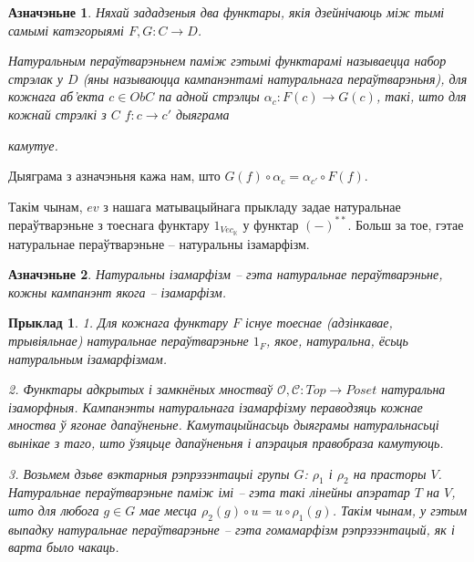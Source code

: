 \documentclass[a4paper,12pt]{book}
\newtheorem{example}{Прыклад}[section]
\newtheorem{definition}{Азначэньне}[section]
\begin{document}
\begin{definition}
  Няхай зададзеныя два функтары, якія дзейнічаюць між тымі самымі
  катэгорыямі $F, G: C \rightarrow D$.

  Натуральным пераўтварэньнем
  паміж гэтымі функтарамі называецца набор стрэлак у $D$ (яны
  называюцца кампанэнтамі натуральнага пераўтварэньня), для
  кожнага аб'екта $c \in Ob C$ па адной стрэлцы $\alpha_c: F(c)
  \rightarrow G(c)$, такі, што для кожнай стрэлкі з $C$ $f:c
  \rightarrow c'$ дыяграма


  камутуе.

\end{definition}

Дыяграма з азначэньня кажа нам, што $G(f) \circ \alpha_c = \alpha_{c'}
\circ F(f)$.

Такім чынам, $ev$ з нашага матывацыйнага прыкладу задае натуральнае
пераўтварэньне з тоеснага функтару $1_{Vec_{\mathbb{K}}}$ у функтар
$(-)^{**}$. Больш за тое, гэтае натуральнае пераўтварэньне --
натуральны ізамарфізм.

\begin{definition}
  Натуральны ізамарфізм -- гэта натуральнае пераўтварэньне, кожны
  кампанэнт якога -- ізамарфізм.
\end{definition}

\begin{example}
  1. Для кожнага функтару $F$ існуе тоеснае (адзінкавае, трывіяльнае)
  натуральнае пераўтварэньне
  $1_F$, якое, натуральна, ёсьць натуральным ізамарфізмам.

  2. Функтары адкрытых і замкнёных мностваў $\mathcal{O}, \mathcal{C}:
  Top \rightarrow Poset$ натуральна ізаморфныя. Кампанэнты
  натуральнага ізамарфізму пераводзяць кожнае мноства ў ягонае
  дапаўненьне. Камутацыйнасьць дыяграмы натуральнасьці вынікае з таго,
  што ўзяцьце дапаўненьня і апэрацыя правобраза камутуюць.

  3. Возьмем дзьве вэктарныя рэпрэзэнтацыі групы $G$: $\rho_1$ і
  $\rho_2$ на прасторы $V$. Натуральнае пераўтварэньне паміж імі --
  гэта такі лінейны апэратар $T$ на $V$, што для любога $g \in G$
  мае месца $\rho_2(g) \circ u = u \circ \rho_1(g)$. Такім чынам, у
  гэтым выпадку натуральнае пераўтварэньне -- гэта гомамарфізм
  рэпрэзэнтацый, як і варта было чакаць.
\end{example}
\end{document}
